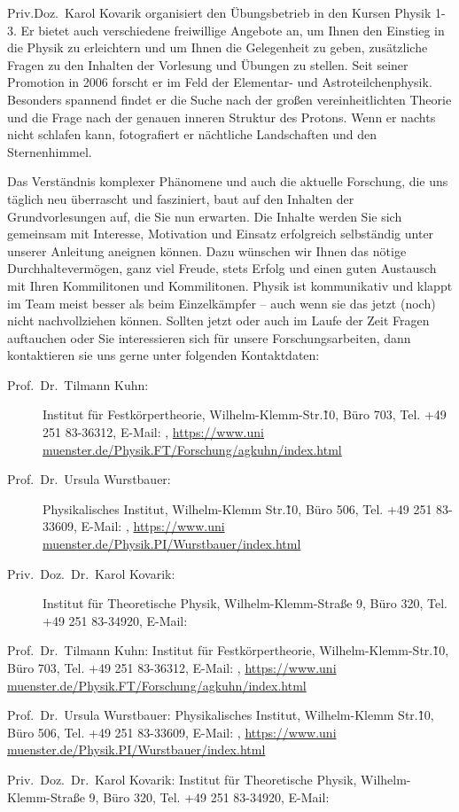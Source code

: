 \begin{multicols}{2}
Priv.\-Doz.\ Karol Kovarik organisiert den Übungsbetrieb in den Kursen Physik 1-3. Er bietet auch 
verschiedene freiwillige Angebote an, um Ihnen den Einstieg in die Physik zu erleichtern und um Ihnen 
die Gelegenheit zu geben, zusätzliche Fragen zu den Inhalten der Vorlesung und Übungen zu stellen. 
Seit seiner Promotion in 2006 forscht er im Feld der Elementar- und Astroteilchenphysik. Besonders 
spannend findet er die Suche nach der großen vereinheitlichten Theorie und die Frage nach der 
genauen inneren Struktur des Protons. Wenn er nachts nicht schlafen kann, fotografiert er nächtliche 
Landschaften und den Sternenhimmel. 

Das Verständnis komplexer Phänomene und auch die aktuelle Forschung, die uns täglich neu 
überrascht und fasziniert, baut auf den Inhalten der Grundvorlesungen auf, die Sie nun erwarten. Die 
Inhalte werden Sie sich gemeinsam mit Interesse, Motivation und Einsatz erfolgreich selbständig unter 
unserer Anleitung aneignen können. Dazu wünschen wir Ihnen das nötige Durchhaltevermögen, ganz 
viel Freude, stets Erfolg und einen guten Austausch mit Ihren Kommilitonen und Kommilitonen. Physik 
ist kommunikativ und klappt im Team meist besser als beim Einzelkämpfer – auch wenn sie das jetzt (noch) 
nicht nachvollziehen können. Sollten jetzt oder auch im Laufe der Zeit Fragen auftauchen oder Sie 
interessieren sich für unsere Forschungsarbeiten, dann kontaktieren sie uns gerne unter folgenden 
Kontaktdaten: 

\begin{description}
	\item[Prof.\ Dr.\ Tilmann Kuhn:] Institut für Festkörpertheorie, Wilhelm-Klemm-Str.\~10, Büro 703, Tel. +49 
		251 83-36312, E-Mail: , \url{https://www.uni
		muenster.de/Physik.FT/Forschung/agkuhn/index.html}

	\item[Prof.\ Dr.\ Ursula Wurstbauer:] Physikalisches Institut, Wilhelm-Klemm Str.\~10, Büro 506, Tel. +49 251 
		83-33609, E-Mail: , \url{https://www.uni
		muenster.de/Physik.PI/Wurstbauer/index.html}

	\item[Priv.\ Doz.\ Dr.\ Karol Kovarik:] Institut für Theoretische Physik, Wilhelm-Klemm-Straße 9, Büro 320, Tel. 
+49 251 83-34920, E-Mail: 
\end{description}

Prof.\ Dr.\ Tilmann Kuhn: Institut für Festkörpertheorie, Wilhelm-Klemm-Str.\~10, Büro 703, Tel. +49 
251 83-36312, E-Mail: , \url{https://www.uni
muenster.de/Physik.FT/Forschung/agkuhn/index.html}

Prof.\ Dr.\ Ursula Wurstbauer: Physikalisches Institut, Wilhelm-Klemm Str.\~10, Büro 506, Tel. +49 251 
83-33609, E-Mail: , \url{https://www.uni
muenster.de/Physik.PI/Wurstbauer/index.html}

Priv.\ Doz.\ Dr.\ Karol Kovarik: Institut für Theoretische Physik, Wilhelm-Klemm-Straße 9, Büro 320, Tel. 
+49 251 83-34920, E-Mail: 

\end{multicols}
